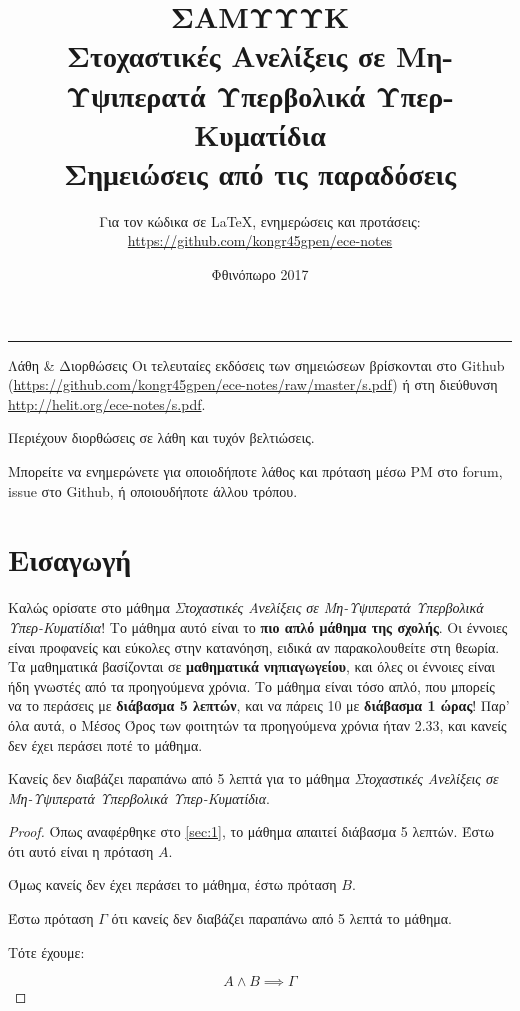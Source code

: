 \documentclass[11pt,a4paper,notitlepage,fleqn]{article}
\title{ΣΑΜΥΥΥΚ
	\\
	{ 
		Στοχαστικές Ανελίξεις σε Μη-Υψιπερατά Υπερβολικά Υπερ-Κυματίδια
		\\
		\normalsize Σημειώσεις από τις παραδόσεις}
	}
\date{Φθινόπωρο 2017
	\\
	{ 
	}
}
\author{
	Για τον κώδικα σε \LaTeX, ενημερώσεις και προτάσεις:
	\\
	\url{https://github.com/kongr45gpen/ece-notes}}
\begin{document}
\maketitle

\hrule
\vspace{50pt}

\begin{infobox}{Λάθη \& Διορθώσεις}
	Οι τελευταίες εκδόσεις των σημειώσεων βρίσκονται στο Github
	(\url{https://github.com/kongr45gpen/ece-notes/raw/master/s.pdf}) ή
	στη διεύθυνση \url{http://helit.org/ece-notes/s.pdf}.
	
	Περιέχουν διορθώσεις σε λάθη και τυχόν βελτιώσεις.
	
	\tcblower
	
	Μπορείτε να ενημερώνετε για οποιοδήποτε λάθος και πρόταση
	μέσω PM στο forum, issue στο Github, ή οποιουδήποτε άλλου τρόπου.
\end{infobox}

{
	\hypersetup{linkcolor=black}
	\tableofcontents
}

\section{Εισαγωγή}
\label{sec:1}
Καλώς ορίσατε στο μάθημα \textit{Στοχαστικές Ανελίξεις σε Μη-Υψιπερατά Υπερβολικά Υπερ-Κυματίδια}! Το μάθημα αυτό είναι το \textbf{πιο απλό μάθημα της σχολής}. Οι έννοιες είναι προφανείς και εύκολες στην κατανόηση, ειδικά αν παρακολουθείτε στη θεωρία. Τα μαθηματικά βασίζονται σε \textbf{μαθηματικά νηπιαγωγείου}, και όλες οι έννοιες είναι ήδη γνωστές από τα προηγούμενα χρόνια. Το μάθημα είναι τόσο απλό, που μπορείς να το περάσεις με \textbf{διάβασμα 5 λεπτών}, και να πάρεις 10 με \textbf{διάβασμα 1 ώρας}! Παρ' όλα αυτά, ο Μέσος Όρος των φοιτητών τα προηγούμενα χρόνια ήταν 2.33, και κανείς δεν έχει περάσει ποτέ το μάθημα.
\begin{theorem}{}{}
	\large
	Κανείς δεν διαβάζει παραπάνω από 5 λεπτά για το μάθημα \textit{Στοχαστικές Ανελίξεις σε Μη-Υψιπερατά Υπερβολικά Υπερ-Κυματίδια}.
\end{theorem}

\begin{proof}
	Όπως αναφέρθηκε στο \autoref{sec:1}, το μάθημα απαιτεί διάβασμα 5 λεπτών. Έστω ότι αυτό είναι η πρόταση \( A \).
	
	Όμως κανείς δεν έχει περάσει το μάθημα, έστω πρόταση \(B\).
	
	Έστω πρόταση \( Γ\) ότι κανείς δεν διαβάζει παραπάνω από 5 λεπτά το μάθημα.
	
	Τότε έχουμε:
	
	\[
	A \wedge B \implies Γ
	\]
\end{proof}
\end{document}
